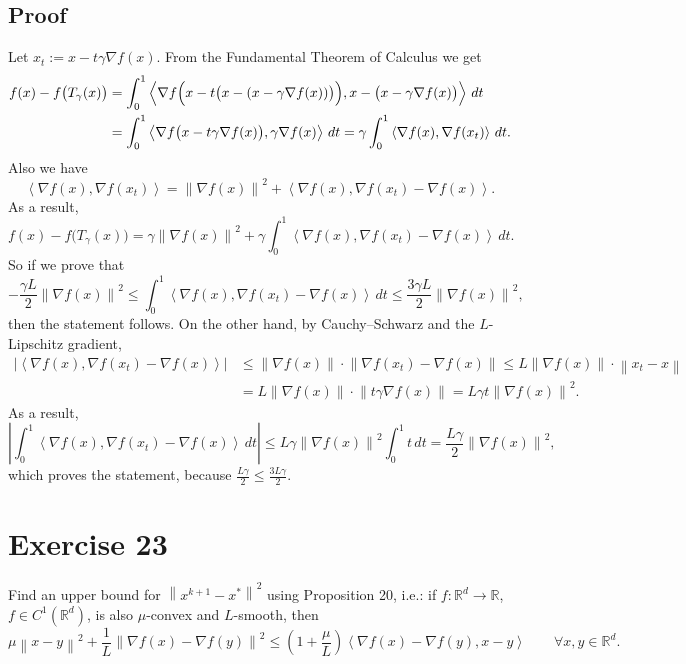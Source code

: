 \documentclass[11pt,a4paper]{article}
\newcommand{\R}{\mathbb{R}}
\newcommand{\norm}[1]{\left\| #1 \right\|}
\newcommand{\ip}[2]{\left\langle #1, #2 \right\rangle}
\begin{document}
\subsection*{Proof}
Let $x_t := x - t\gamma\nabla f(x)$. From the Fundamental Theorem of Calculus we get
\begin{align*}
  f(x) - f\bigl(T_\gamma(x)\bigr)
  &= \int_0^1 \ip{\nabla f\Bigl(x - t\bigl(x - (x - \gamma\nabla f(x))\bigr)\Bigr)}{x - \bigl(x - \gamma\nabla f(x)\bigr)}\,dt \\
  &= \int_0^1 \ip{\nabla f\bigl(x - t\gamma\nabla f(x)\bigr)}{\gamma\nabla f(x)}\,dt
  = \gamma\int_0^1 \ip{\nabla f(x)}{\nabla f(x_t)}\,dt .
\end{align*}
Also we have
\[
  \ip{\nabla f(x)}{\nabla f(x_t)} = \norm{\nabla f(x)}^2 + \ip{\nabla f(x)}{\nabla f(x_t) - \nabla f(x)} .
\]
As a result,
\[
  f(x) - f\bigl(T_\gamma(x)\bigr)
  = \gamma\norm{\nabla f(x)}^2 + \gamma\int_0^1 \ip{\nabla f(x)}{\nabla f(x_t) - \nabla f(x)}\,dt .
\]
So if we prove that
\[
  -\frac{\gamma L}{2}\norm{\nabla f(x)}^2
  \le \int_0^1 \ip{\nabla f(x)}{\nabla f(x_t) - \nabla f(x)}\,dt
  \le \frac{3\gamma L}{2}\norm{\nabla f(x)}^2,
\]
then the statement follows.
On the other hand, by Cauchy--Schwarz and the $L$-Lipschitz gradient,
\begin{align*}
  \bigl|\ip{\nabla f(x)}{\nabla f(x_t) - \nabla f(x)}\bigr|
  &\le \norm{\nabla f(x)}\cdot\norm{\nabla f(x_t) - \nabla f(x)}
  \le L\norm{\nabla f(x)}\cdot\norm{x_t - x} \\
  &= L\norm{\nabla f(x)}\cdot\norm{t\gamma\nabla f(x)}
  = L\gamma t\norm{\nabla f(x)}^2 .
\end{align*}
As a result,
\[
  \left|\int_0^1 \ip{\nabla f(x)}{\nabla f(x_t) - \nabla f(x)}\,dt\right|
  \le L\gamma\norm{\nabla f(x)}^2\int_0^1 t\,dt
  = \frac{L\gamma}{2}\norm{\nabla f(x)}^2,
\]
which proves the statement, because $\frac{L\gamma}{2} \le \frac{3L\gamma}{2}$.

\section*{Exercise 23}

Find an upper bound for $\norm{x^{k+1} - x^*}^2$ using Proposition 20, i.e.: if
$f\colon \R^d \to \R$, $f \in C^1(\R^d)$, is also $\mu$-convex and $L$-smooth, then
\[
  \mu\norm{x-y}^2 + \frac{1}{L}\norm{\nabla f(x) - \nabla f(y)}^2
  \le \left(1 + \frac{\mu}{L}\right)\ip{\nabla f(x) - \nabla f(y)}{x-y}
  \qquad \forall x, y \in \R^d .
\]
\end{document}
